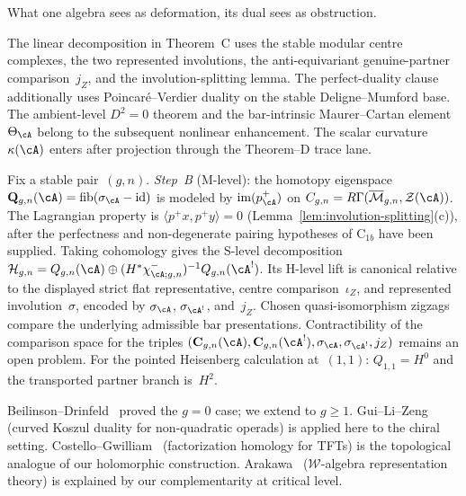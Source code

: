 \begin{remark}\label{rem:lagrangian-decomp}
What one algebra sees as deformation, its dual sees as obstruction.
\end{remark}

\begin{remark}
\label{rem:theorem-c-mok-independence}
The linear decomposition in Theorem~C uses the stable modular centre
complexes, the two represented involutions, the anti-equivariant
genuine-partner comparison~$j_Z$, and the involution-splitting lemma.
The perfect-duality clause additionally uses Poincar\'e--Verdier
duality on the stable Deligne--Mumford base.  The ambient-level
$D^2=0$ theorem and the bar-intrinsic Maurer--Cartan element
$\Theta_\cA$ belong to the subsequent nonlinear enhancement.  The
scalar curvature~$\kappa(\cA)$ enters after projection through the
Theorem--D trace lane.
\end{remark}

\begin{remark}
\label{rem:theorem-c-model}
\label{rem:complementarity-model}%
Fix a stable pair~$(g,n)$.  \emph{Step~B} (M-level): the homotopy
eigenspace
$\mathbf{Q}_{g,n}(\cA)=\operatorname{fib}(\sigma_\cA-\mathrm{id})$
is modeled by $\operatorname{im}(p_\cA^+)$ on
$C_{g,n}=R\Gamma(\overline{\mathcal{M}}_{g,n},\mathcal{Z}(\cA))$.
The Lagrangian property is $\langle p^+x,p^+y\rangle=0$
(Lemma~\ref{lem:involution-splitting}(c)), after the
perfectness and non-degenerate pairing hypotheses of
$\mathrm{C}_{1b}$ have been supplied.
Taking cohomology gives the S-level decomposition
$\mathcal{H}_{g,n}=Q_{g,n}(\cA)\oplus
(H^*\chi^-_{\cA;g,n})^{-1}Q_{g,n}(\cA^!)$.  Its H-level lift is
canonical relative to the displayed strict flat representative,
centre comparison~$\iota_Z$, and represented involution~$\sigma$,
encoded by $\sigma_\cA$, $\sigma_{\cA^!}$, and~$j_Z$.
Chosen quasi-isomorphism zigzags compare the underlying admissible bar
presentations.  Contractibility of the comparison space for the triples
$(\mathbf C_{g,n}(\cA),\mathbf C_{g,n}(\cA^!),
\sigma_\cA,\sigma_{\cA^!},j_Z)$ remains an open problem.
For the pointed Heisenberg calculation at~$(1,1)$:
$Q_{1,1}=H^0$ and the transported partner branch is~$H^2$.
\end{remark}

\begin{remark}
Beilinson--Drinfeld~\cite[Chapter~4]{BD04} proved the $g=0$ case;
we extend to $g\geq 1$.
Gui--Li--Zeng~\cite{GLZ22} (curved Koszul duality for non-quadratic
operads) is applied here to the chiral setting.
Costello--Gwilliam~\cite{CG17} (factorization homology for TFTs)
is the topological analogue of our holomorphic construction.
Arakawa~\cite{Ara12} ($\mathcal{W}$-algebra representation theory)
is explained by our complementarity at critical level.
\end{remark}

